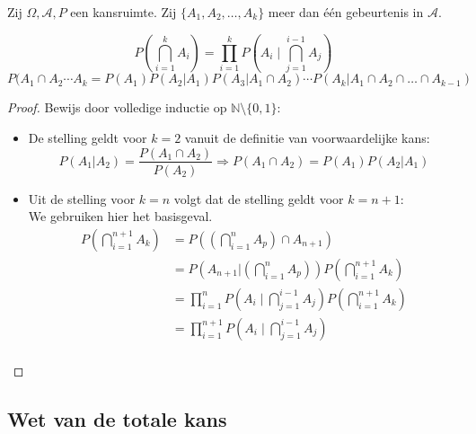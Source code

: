 \documentclass[main.tex]{subfiles}
\begin{document}
\begin{st}
  Zij $\Omega,\mathcal{A},P$ een kansruimte.
  Zij $\{ A_{1}, A_{2}, \dotsc, A_{k}\}$ meer dan \'e\'en gebeurtenis in $\mathcal{A}$.

  \[
  P\left(\bigcap_{i=1}^{k}A_{i}\right)
  = \prod_{i=1}^{k}P\left(A_{i}\mid\bigcap_{j=1}^{i-1}A_{j}\right)
  \]
  \[
  P(A_{1}\cap A_{2} \dotsb A_{k}
  = P(A_{1})P(A_{2}|A_{1})P(A_{3}|A_{1}\cap A_{2}) \dotsb P(A_{k}|A_{1}\cap A_{2}\cap \dotsc \cap A_{k-1})
  \]

  \begin{proof}
    Bewijs door volledige inductie op $\mathbb{N} \setminus \{0,1\}$:
    \begin{itemize}
    \item De stelling geldt voor $k=2$ vanuit de definitie van voorwaardelijke kans: 
      \[  P(A_{1}|A_{2}) = \frac{P(A_{1}\cap A_{2})}{P(A_{2})} \Rightarrow P(A_{1} \cap A_{2}) = P(A_{1}) P(A_{2}|A_{1}) \]
    \item Uit de stelling voor $k=n$ volgt dat de stelling geldt voor $k=n+1$:\\
      We gebruiken hier het basisgeval.
      \[ 
      \begin{array}{rl}
        P\left(\bigcap_{i=1}^{n+1}A_{k}\right)
        &= P\left(\left(\bigcap_{i=1}^{n}A_{p}\right) \cap A_{n+1} \right)\\
        &= P\left(A_{n+1} | \left(\bigcap_{i=1}^{n}A_{p}\right) \right) P\left(\bigcap_{i=1}^{n+1}A_{k}\right)\\
        &= \prod_{i=1}^{n}P\left(A_{i}\mid\bigcap_{j=1}^{i-1}A_{j}\right) P\left(\bigcap_{i=1}^{n+1}A_{k}\right)\\
        &= \prod_{i=1}^{n+1}P\left(A_{i}\mid\bigcap_{j=1}^{i-1}A_{j}\right)\\
      \end{array}
      \]
    \end{itemize}
  \end{proof}
\end{st}

\subsection{Wet van de totale kans}
\label{sec:wet-van-de}
\end{document}
